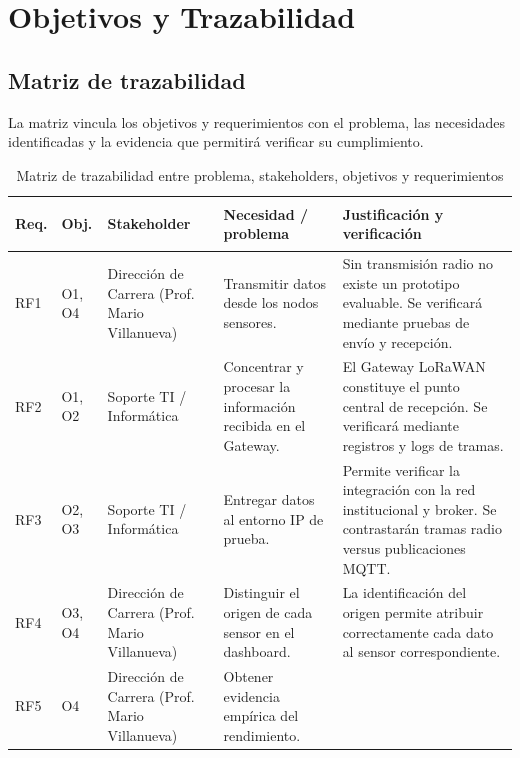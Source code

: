 \documentclass[12pt,oneside,openany,spanish,oldfontcommands]{memoir}
\begin{document}
\chapter{Objetivos y Trazabilidad}

\section{Matriz de trazabilidad}

La matriz vincula los objetivos y requerimientos con el problema, las necesidades
identificadas y la evidencia que permitirá verificar su cumplimiento.

\begin{table}[H]
\centering
\caption{Matriz de trazabilidad entre problema, stakeholders, objetivos y requerimientos}
\label{tab:trazabilidad}
\tiny
\begin{tabularx}{\textwidth}{
  >{\bfseries\raggedright\arraybackslash}p{0.8cm}
  >{\raggedright\arraybackslash}p{1.5cm}
  >{\raggedright\arraybackslash}p{2.3cm}
  >{\raggedright\arraybackslash}X
  >{\raggedright\arraybackslash}X}
\toprule
\textbf{Req.} &
\textbf{Obj.} &
\textbf{Stakeholder} &
\textbf{Necesidad / problema} &
\textbf{Justificación y verificación}\\
\midrule
RF1 & O1, O4 &
Dirección de Carrera (Prof. Mario Villanueva)
&
Transmitir datos desde los nodos sensores.
&
Sin transmisión radio no existe un prototipo evaluable. Se verificará mediante pruebas de envío y recepción.
\\
\midrule
RF2 & O1, O2 &
Soporte TI / Informática
&
Concentrar y procesar la información recibida en el Gateway.
&
El Gateway LoRaWAN constituye el punto central de recepción. Se verificará mediante registros y logs de tramas.
\\
\midrule
RF3 & O2, O3 &
Soporte TI / Informática
&
Entregar datos al entorno IP de prueba.
&
Permite verificar la integración con la red institucional y broker. Se contrastarán tramas radio versus publicaciones MQTT.
\\
\midrule
RF4 & O3, O4 &
Dirección de Carrera (Prof. Mario Villanueva)
&
Distinguir el origen de cada sensor en el dashboard.
&
La identificación del origen permite atribuir correctamente cada dato al sensor correspondiente.
\\
\midrule
RF5 & O4 &
Dirección de Carrera (Prof. Mario Villanueva)
&
Obtener evidencia empírica del rendimiento.

\end{tabularx}
\end{table}
\end{document}
